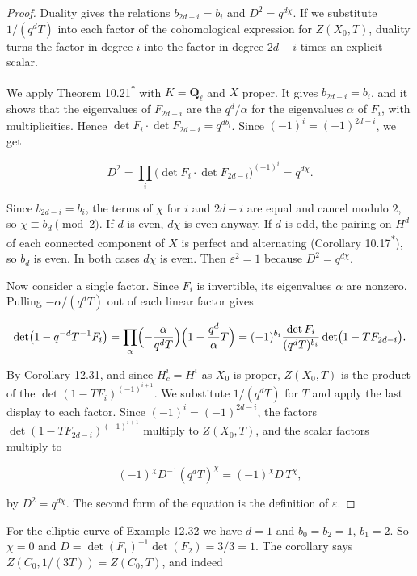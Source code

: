 \documentclass[11pt]{article}
\newcommand{\bpout}[1]{#1\textsuperscript{\hyperlink{bp-outside}{\ensuremath{\ast}}}}
\begin{document}
\begin{proof}[{Proof}]\label{bp101}%
Duality gives the relations \(b_{2d-i}=b_i\) and \(D^2=q^{d\chi}\). If we substitute \(1/(q^dT)\) into each factor of the cohomological expression for \(Z(X_0,T)\), duality turns the factor in degree \(i\) into the factor in degree \(2d-i\) times an explicit scalar.

We apply Theorem \bpout{10.21} with \(K=\mathbf Q_\ell\) and \(X\) proper. It gives \(b_{2d-i}=b_i\), and it shows that the eigenvalues of \(F_{2d-i}\) are the \(q^d/\alpha\) for the eigenvalues \(\alpha\) of \(F_i\), with multiplicities. Hence \(\det F_i\cdot\det F_{2d-i}=q^{db_i}\). Since \((-1)^i=(-1)^{2d-i}\), we get

\[
D^2=\prod_i\bigl(\det F_i\cdot\det F_{2d-i}\bigr)^{(-1)^i}
=q^{d\chi}.
\]

Since \(b_{2d-i}=b_i\), the terms of \(\chi\) for \(i\) and \(2d-i\) are equal and cancel modulo \(2\), so \(\chi\equiv b_d\pmod 2\). If \(d\) is even, \(d\chi\) is even anyway. If \(d\) is odd, the pairing on \(H^d\) of each connected component of \(X\) is perfect and alternating (Corollary \bpout{10.17}), so \(b_d\) is even. In both cases \(d\chi\) is even. Then \(\varepsilon^2=1\) because \(D^2=q^{d\chi}\).

Now consider a single factor. Since \(F_i\) is invertible, its eigenvalues \(\alpha\) are nonzero. Pulling \(-\alpha/(q^dT)\) out of each linear factor gives

\[
\det\bigl(1-q^{-d}T^{-1}F_i\bigr)
=\prod_\alpha\Bigl(-\frac{\alpha}{q^dT}\Bigr)\Bigl(1-\frac{q^d}{\alpha}T\Bigr)
=(-1)^{b_i}\frac{\det F_i}{(q^dT)^{b_i}}\det\bigl(1-TF_{2d-i}\bigr).
\]

By Corollary \hyperref[bp95]{12.31}, and since \(H^i_c=H^i\) as \(X_0\) is proper, \(Z(X_0,T)\) is the product of the \(\det(1-TF_i)^{(-1)^{i+1}}\). We substitute \(1/(q^dT)\) for \(T\) and apply the last display to each factor. Since \((-1)^i=(-1)^{2d-i}\), the factors \(\det(1-TF_{2d-i})^{(-1)^{i+1}}\) multiply to \(Z(X_0,T)\), and the scalar factors multiply to

\[
(-1)^{\chi}D^{-1}(q^dT)^{\chi}=(-1)^{\chi}D\,T^{\chi},
\]

by \(D^2=q^{d\chi}\). The second form of the equation is the definition of \(\varepsilon\).
\end{proof}

\label{bp102}%
For the elliptic curve of Example \hyperref[bp98]{12.32} we have \(d=1\) and \(b_0=b_2=1\), \(b_1=2\). So \(\chi=0\) and \(D=\det(F_1)^{-1}\det(F_2)=3/3=1\). The corollary says \(Z(C_0,1/(3T))=Z(C_0,T)\), and indeed
\end{document}
